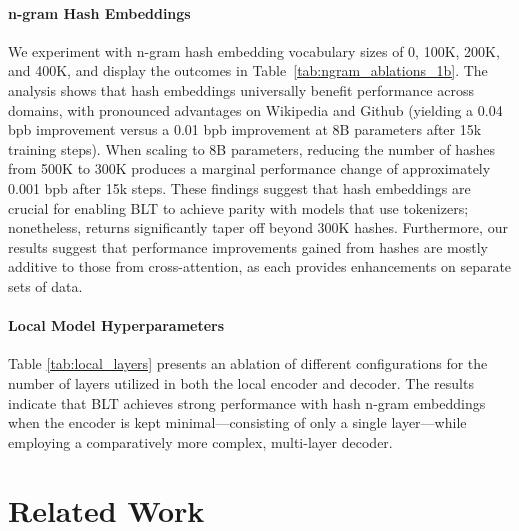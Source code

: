 \paragraph{n-gram Hash Embeddings} 

We experiment with n-gram hash embedding vocabulary sizes of 0, 100K, 200K, and 400K, and display the outcomes in Table~\ref{tab:ngram_ablations_1b}. The analysis shows that hash embeddings universally benefit performance across domains, with pronounced advantages on Wikipedia and Github (yielding a 0.04 bpb improvement versus a 0.01 bpb improvement at 8B parameters after 15k training steps). When scaling to 8B parameters, reducing the number of hashes from 500K to 300K produces a marginal performance change of approximately 0.001 bpb after 15k steps. These findings suggest that hash embeddings are crucial for enabling {\textsc BLT} to achieve parity with models that use tokenizers; nonetheless, returns significantly taper off beyond 300K hashes. Furthermore, our results suggest that performance improvements gained from hashes are mostly additive to those from cross-attention, as each provides enhancements on separate sets of data.

\paragraph{Local Model Hyperparameters} Table \ref{tab:local_layers} presents an ablation of different configurations for the number of layers utilized in both the local encoder and decoder. The results indicate that {\textsc BLT} achieves strong performance with hash n-gram embeddings when the encoder is kept minimal—consisting of only a single layer—while employing a comparatively more complex, multi-layer decoder.

\section{Related Work}
\label{section:related_work}

